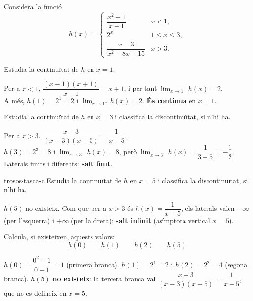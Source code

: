 Considera la funció
\[
h(x)=\begin{cases}
  \dfrac{x^2-1}{x-1} & \si{x<1},\\[8pt]
  2^{x} & \si{1\le x\le 3},\\[4pt]
  \dfrac{x-3}{x^2-8x+15} & \si{x>3}.
\end{cases}
\]

\begin{apartats}

\begin{nomesllarg}
Estudia la continuïtat de $h$ en $x=1$.

\begin{solucio}
Per a $x<1$, $\dfrac{(x-1)(x+1)}{x-1}=x+1$, i per tant $\lim_{x\to1^-}h(x)=2$.\\
A més, $h(1)=2^1=2$ i $\lim_{x\to1^+}h(x)=2$. \textbf{És contínua} en $x=1$.
\end{solucio}
\end{nomesllarg}

Estudia la continuïtat de $h$ en $x=3$ i classifica la discontinuïtat, si n'hi ha.

\begin{solucio}
Per a $x>3$, $\dfrac{x-3}{(x-3)(x-5)}=\dfrac{1}{x-5}$.\\
$h(3)=2^3=8$ i $\lim_{x\to3^-}h(x)=8$, però $\lim_{x\to3^+}h(x)=\dfrac{1}{3-5}=-\dfrac12$.
Laterals finits i diferents: \textbf{salt finit}.
\end{solucio}

\begin{tria}{trosos-tasca-c}
Estudia la continuïtat de $h$ en $x=5$ i classifica la discontinuïtat, si n'hi ha.

\begin{solucio}
$h(5)$ no existeix. Com que per a $x>3$ és $h(x)=\dfrac{1}{x-5}$, els laterals valen
$-\infty$ (per l'esquerra) i $+\infty$ (per la dreta): \textbf{salt infinit} (asímptota
vertical $x=5$).
\end{solucio}

Calcula, si existeixen, aquests valors:
\[
h(0) \qquad h(1) \qquad h(2) \qquad h(5)
\]

\begin{solucio}
$h(0)=\dfrac{0^2-1}{0-1}=1$ (primera branca). $h(1)=2^1=2$ i $h(2)=2^2=4$ (segona
branca). $h(5)$ \textbf{no existeix}: la tercera branca val
$\dfrac{x-3}{(x-3)(x-5)}=\dfrac1{x-5}$, que no es defineix en $x=5$.
\end{solucio}
\end{tria}

\end{apartats}
